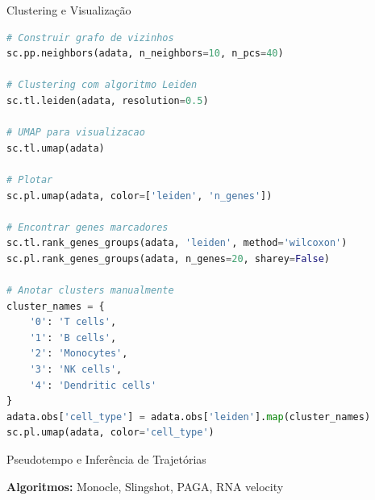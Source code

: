 \begin{frame}[fragile]{Clustering e Visualização}
\begin{lstlisting}[language=Python, caption=Clustering e UMAP, basicstyle=\ttfamily\footnotesize]
# Construir grafo de vizinhos
sc.pp.neighbors(adata, n_neighbors=10, n_pcs=40)

# Clustering com algoritmo Leiden
sc.tl.leiden(adata, resolution=0.5)

# UMAP para visualizacao
sc.tl.umap(adata)

# Plotar
sc.pl.umap(adata, color=['leiden', 'n_genes'])

# Encontrar genes marcadores
sc.tl.rank_genes_groups(adata, 'leiden', method='wilcoxon')
sc.pl.rank_genes_groups(adata, n_genes=20, sharey=False)

# Anotar clusters manualmente
cluster_names = {
    '0': 'T cells',
    '1': 'B cells',
    '2': 'Monocytes',
    '3': 'NK cells',
    '4': 'Dendritic cells'
}
adata.obs['cell_type'] = adata.obs['leiden'].map(cluster_names)
sc.pl.umap(adata, color='cell_type')
\end{lstlisting}
\end{frame}

\begin{frame}{Pseudotempo e Inferência de Trajetórias}

\vspace{0.3cm}

\begin{center}
\end{center}

\textbf{Algoritmos:} Monocle, Slingshot, PAGA, RNA velocity
\end{frame}

